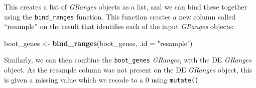 \documentclass[
]{article}
\newenvironment{Shaded}{}{}
\newcommand{\DataTypeTok}[1]{\textcolor[rgb]{0.56,0.13,0.00}{#1}}
\newcommand{\KeywordTok}[1]{\textcolor[rgb]{0.00,0.44,0.13}{\textbf{#1}}}
\newcommand{\NormalTok}[1]{#1}
\newcommand{\OperatorTok}[1]{\textcolor[rgb]{0.40,0.40,0.40}{#1}}
\newcommand{\StringTok}[1]{\textcolor[rgb]{0.25,0.44,0.63}{#1}}
\begin{document}
This creates a list of \emph{GRanges} objects as a list, and we can bind these together
using the \texttt{bind\_ranges} function. This function creates a new column called
``resample'' on the result that identifies each of the input \emph{GRanges} objects:

\begin{Shaded}
\begin{Highlighting}[]
\NormalTok{boot_genes <-}\StringTok{ }\KeywordTok{bind_ranges}\NormalTok{(boot_genes, }\DataTypeTok{.id =} \StringTok{"resample"}\NormalTok{)}
\end{Highlighting}
\end{Shaded}

Similarly, we can then combine the \texttt{boot\_genes} \emph{GRanges}, with the DE
\emph{GRanges} object. As the resample column was not present on the DE \emph{GRanges}
object, this is given a missing value which we recode to a 0 using \texttt{mutate()}

\begin{Shaded}
\end{Shaded}
\end{document}
